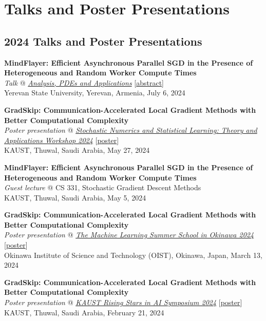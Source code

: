 \documentclass[11pt,a4paper,sans]{moderncv}        %
\begin{document}
\section{Talks and Poster Presentations}
\vspace{4pt}

\subsection{2024 Talks and Poster Presentations}
\begin{etaremune}
\item \textbf{MindFlayer: Efficient Asynchronous Parallel SGD in the Presence of Heterogeneous and Random Worker Compute Times} \\
\textit{Talk} @ \textcolor{accent}{\href{https://gmg70.com/}{\textit{Analysis, PDEs and Applications}}} [\href{https://gmg70.com/downloads/ConferenceAbstracts.pdf#page=19}{abstract}]\\
Yerevan State University, Yerevan, Armenia, July 6, 2024

\item \textbf{GradSkip: Communication-Accelerated Local Gradient Methods with Better Computational Complexity}\\
\textit{Poster presentation} @ \textcolor{accent}{\href{https://cemse.kaust.edu.sa/events/event/snsl-workshop-2024}{\textit{Stochastic Numerics and Statistical Learning: Theory and Applications Workshop 2024}}} [\href{https://artomaranjyan.github.io/assets/pdf/GradSkip_Rising_Stars.pdf}{poster}]\\
KAUST, Thuwal, Saudi Arabia, May 27, 2024

\item \textbf{MindFlayer: Efficient Asynchronous Parallel SGD in the Presence of Heterogeneous and Random Worker Compute Times}\\
\textit{Guest lecture} @ CS 331, Stochastic Gradient Descent Methods \\
KAUST, Thuwal, Saudi Arabia, May 5, 2024

\item \textbf{GradSkip: Communication-Accelerated Local Gradient Methods with Better Computational Complexity}\\
\textit{Poster presentation} @ \textcolor{accent}{\href{https://groups.oist.jp/mlss}{\textit{The Machine Learning Summer School in Okinawa 2024
}}} [\href{https://artomaranjyan.github.io/assets/pdf/GradSkip_MLSS_Okinawa.pdf}{poster}] \\
Okinawa Institute of Science and Technology (OIST), Okinawa, Japan, March 13, 2024

\item \textbf{GradSkip: Communication-Accelerated Local Gradient Methods with Better Computational Complexity}\\
\textit{Poster presentation} @ \textcolor{accent}{\href{https://cemse.kaust.edu.sa/ai/aii-symp-2024}{\textit{KAUST Rising Stars in AI Symposium 2024}}} [\href{https://artomaranjyan.github.io/assets/pdf/GradSkip_Rising_Stars.pdf}{poster}]\\
KAUST, Thuwal, Saudi Arabia, February 21, 2024
\end{etaremune}
\end{document}
